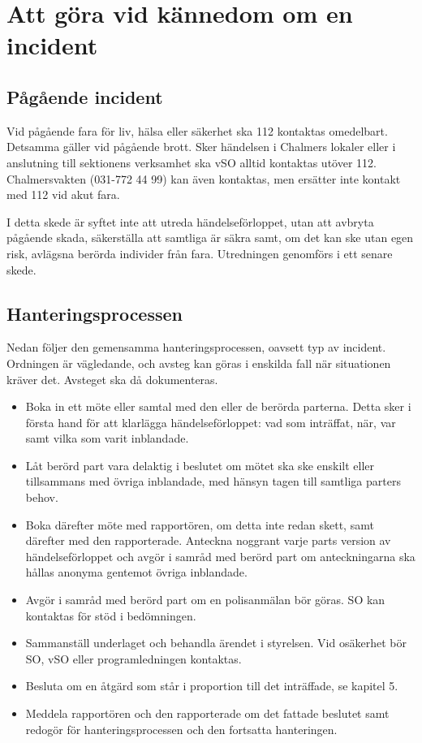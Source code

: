 \section{Att göra vid kännedom om en incident}

\subsection{Pågående incident}
Vid pågående fara för liv, hälsa eller säkerhet ska 112 kontaktas omedelbart. Detsamma gäller vid pågående brott. Sker händelsen i Chalmers lokaler eller i anslutning till sektionens verksamhet ska vSO alltid kontaktas utöver 112. Chalmersvakten (031-772 44 99) kan även kontaktas, men ersätter inte kontakt med 112 vid akut fara.

I detta skede är syftet inte att utreda händelseförloppet, utan att avbryta pågående skada, säkerställa att samtliga är säkra samt, om det kan ske utan egen risk, avlägsna berörda individer från fara. Utredningen genomförs i ett senare skede.

\subsection{Hanteringsprocessen}
Nedan följer den gemensamma hanteringsprocessen, oavsett typ av incident. Ordningen är vägledande, och avsteg kan göras i enskilda fall när situationen kräver det. Avsteget ska då dokumenteras.
\begin{itemize}
\item Boka in ett möte eller samtal med den eller de berörda parterna. Detta sker i första hand för att klarlägga händelseförloppet: vad som inträffat, när, var samt vilka som varit inblandade.
\item Låt berörd part vara delaktig i beslutet om mötet ska ske enskilt eller tillsammans med övriga inblandade, med hänsyn tagen till samtliga parters behov.
\item Boka därefter möte med rapportören, om detta inte redan skett, samt därefter med den rapporterade. Anteckna noggrant varje parts version av händelseförloppet och avgör i samråd med berörd part om anteckningarna ska hållas anonyma gentemot övriga inblandade.
\item Avgör i samråd med berörd part om en polisanmälan bör göras. SO kan kontaktas för stöd i bedömningen.
\item Sammanställ underlaget och behandla ärendet i styrelsen. Vid osäkerhet bör SO, vSO eller programledningen kontaktas.
\item Besluta om en åtgärd som står i proportion till det inträffade, se kapitel 5.
\item Meddela rapportören och den rapporterade om det fattade beslutet samt redogör för hanteringsprocessen och den fortsatta hanteringen.
\end{itemize}

